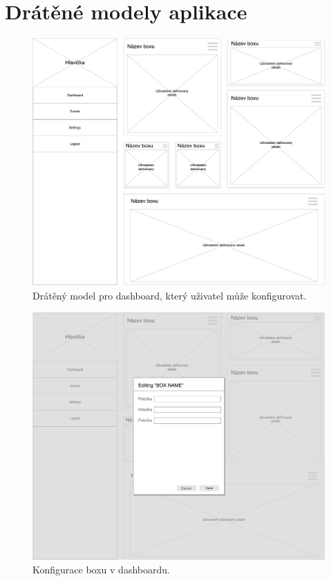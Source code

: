 \chapter{Drátěné modely aplikace}

\begin{figure}[ht]
    \centering
    \includegraphics[width=1\textwidth]{fig/wf_dashboard.pdf}
    \caption{Drátěný model pro dashboard, který uživatel může konfigurovat.} \label{wf:dashboard}
\end{figure}

\begin{figure}[ht]
    \centering
    \includegraphics[width=1\textwidth]{fig/wf_dashboard_edit.pdf}
    \caption{Konfigurace boxu v dashboardu.} \label{wf:dashboard_edit}
\end{figure}


